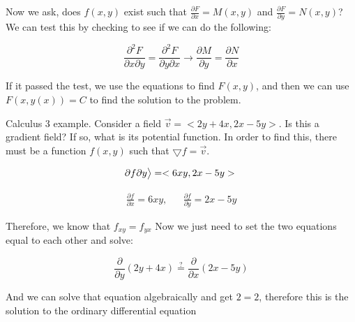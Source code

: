    Now we ask, does $f(x,y)$ exist such that $\frac{\partial F}{\partial x} =  M(x,y)$ and $\frac{\partial F}{\partial y} = N(x,y)$? We can test this by checking to see if we can do the following:

    \[
      \frac{\partial^2F}{\partial x\partial y}=\frac{\partial^2 F}{\partial y\partial x}\rightarrow\boxed{\frac{\partial M}{\partial y}=\frac{\partial N}{\partial x}}
    \]

    If it passed the test, we use the equations to find $F(x,y)$, and then we can use $F(x,y(x))=C$ to find the solution to the problem.

    \begin{problem}
      Calculus 3 example. Consider a field $\vec{v}=<2y+4x,2x-5y>$. Is this a gradient field? If so, what is its potential function. In order to find this, there must be a function $f(x,y)$ such that $\bigtriangledown f=\vec{v}$.
    
    
      \[
        {\partial f}{\partial y}\big>=<6xy,2x-5y>\\
      \]
  
      \begin{align*}
        \frac{\partial f}{\partial x}=6xy,&& \frac{\partial f}{\partial y}=2x-5y
      \end{align*}
  
      Therefore, we know that $f_{xy}=f_{yx}$ Now we just need to set the two equations equal to each other and solve:
  
      \[
        \frac{\partial}{\partial y}(2y+4x)\stackrel{?}{=}\frac{\partial}{\partial x}(2x-5y)
      \]
  
      And we can solve that equation algebraically and get $2=2$, therefore this is the solution to the ordinary differential equation
  
    \end{problem}

